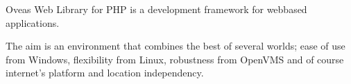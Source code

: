 Oveas Web Library for PHP is a development framework for webbased applications.

The aim is an environment that combines the best of several worlds; ease of use from Windows, flexibility from Linux, robustness from OpenVMS and of course internet's platform and location independency. 